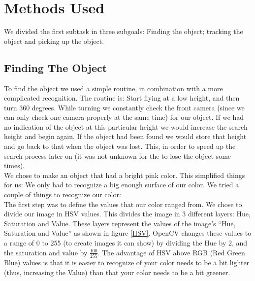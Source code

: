 \section{Methods Used}
We divided the first subtask in three subgoals: Finding the object; tracking the object and picking up the object. 

\subsection{Finding The Object}
To find the object we used a simple routine, in combination with a more complicated recognition. The routine is: Start flying at a low height, and then turn 360 degrees.
 While turning we constantly check the front camera (since we can only check one camera properly at the same time) for our object. If we had no indication of the object
at this particular height we would increase the search height and begin again.
If the object had been found we would store that height and go back to that when
the object was lost. This, in order to speed up the search process later on (it was not unknown for the \Ardrone to lose the object some times). \\

We chose to make an object that had a bright pink color. This simplified things
for us: We only had to recognize a big enough surface of our color. We tried a
	couple of things to recognize our color:\\

The first step was to define the values that our color ranged from. We chose to
divide our image in HSV values. This divides the image in 3 different layers:
Hue, Saturation and Value. These layers represent the values of the image's
``Hue, Saturation and Value'' as shown in figure \ref{HSV}. OpenCV changes these
values to a range of 0 to 255 (to create images it can show) by dividing the Hue
by 2, and the saturation and value by $\frac{100}{255}$. The advantage of HSV
above RGB (Red Green Blue) values is that it is easier to recognize of your
color needs to be a bit lighter (thus, increasing the Value) than that your
color needs to be a bit greener.\\

